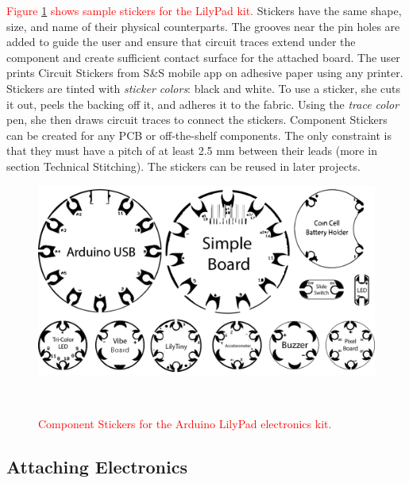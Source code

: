 \documentclass[header.tex]{subfiles}
\begin{document}
\textcolor{red}{Figure \ref{fig:ComponentStickers} shows sample stickers for the LilyPad kit.} Stickers have the same shape, size, and name of their physical counterparts.  
The grooves near the pin holes are added to guide the user and ensure that circuit traces extend under the component and create sufficient contact surface for the attached board. 
The user prints Circuit Stickers from S\&S mobile app on adhesive paper using any printer. Stickers are tinted with \textit{sticker colors}: black and white. To use a sticker, she cuts it out, peels the backing off it, and adheres it to the fabric. %
Using the \textit{trace color} pen, she then draws circuit traces to connect the stickers. 
Component Stickers can be created for any PCB or off-the-shelf components. The only constraint is that they must have a pitch of at least 2.5 mm between their leads (more in section Technical Stitching). The stickers can be reused in later projects.


\begin{figure}
\centering
  \includegraphics[width=0.9\columnwidth]{figures/ComponentStickers.png}
  \caption{\textcolor{red}{Component Stickers for the Arduino LilyPad electronics kit.}}~\label{fig:ComponentStickers}
  \vspace{-1.5em}
\end{figure}

\subsection{Attaching Electronics}
\end{document}
